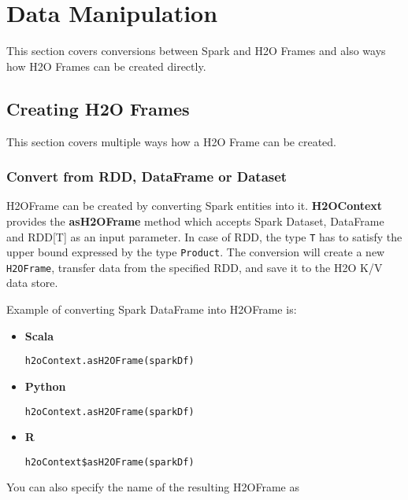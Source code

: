 \documentclass{standalone}
\begin{document}
    \section{Data Manipulation}

    This section covers conversions between Spark and H2O Frames and also ways how H2O Frames can be created directly.

    \subsection{Creating H2O Frames}

    This section covers multiple ways how a H2O Frame can be created.

    \subsubsection{Convert from RDD, DataFrame or Dataset}

    H2OFrame can be created by converting Spark entities into it. \textbf{H2OContext} provides the
    \textbf{asH2OFrame} method which accepts Spark Dataset, DataFrame and RDD[T] as an input parameter.
    In case of RDD, the type \texttt{T} has to satisfy the upper bound expressed by the type \texttt{Product}.
    The conversion will create a new \texttt{H2OFrame}, transfer data from the specified RDD, and save it to the
    H2O K/V data store.

    Example of converting Spark DataFrame into H2OFrame is:

    \begin{itemize}
        \item \textbf{Scala} \begin{lstlisting}[style=Scala]
h2oContext.asH2OFrame(sparkDf)
        \end{lstlisting}
        \item \textbf{Python} \begin{lstlisting}[style=Python]
h2oContext.asH2OFrame(sparkDf)
        \end{lstlisting}
        \item \textbf{R} \begin{lstlisting}[style=R]
h2oContext$asH2OFrame(sparkDf)
        \end{lstlisting}
    \end{itemize}

    You can also specify the name of the resulting H2OFrame as
\end{document}
